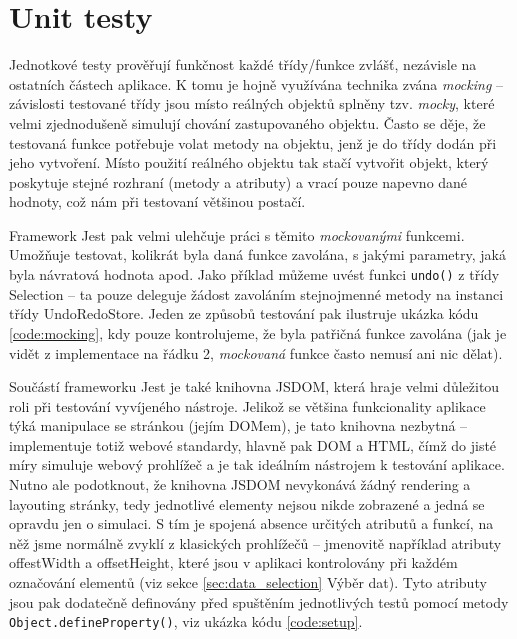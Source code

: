 \documentclass[thesis=B,czech]{FITthesis}[2012/06/26]
\begin{document}

\section{Unit testy}
Jednotkové testy prověřují funkčnost každé třídy/funkce zvlášť, nezávisle na ostatních částech aplikace. K tomu je hojně využívána technika zvána \emph{mocking} -- závislosti testované třídy jsou místo reálných objektů splněny tzv. \emph{mocky}, které velmi zjednodušeně simulují chování zastupovaného objektu. Často se děje, že testovaná funkce potřebuje volat metody na objektu, jenž je do třídy dodán při jeho vytvoření. Místo použití reálného objektu tak stačí vytvořit objekt, který poskytuje stejné rozhraní (metody a atributy) a vrací pouze napevno dané hodnoty, což nám při testovaní většinou postačí.

Framework Jest pak velmi ulehčuje práci s těmito \emph{mockovanými} funkcemi. Umožňuje testovat, kolikrát byla daná funkce zavolána, s jakými parametry, jaká byla návratová hodnota apod. Jako příklad můžeme uvést funkci \verb|undo()| z třídy Selection -- ta pouze deleguje žádost zavoláním stejnojmenné metody na instanci třídy UndoRedoStore. Jeden ze způsobů testování pak ilustruje ukázka kódu \ref{code:mocking}, kdy pouze kontrolujeme, že byla patřičná funkce zavolána (jak je vidět z implementace na řádku 2, \emph{mockovaná} funkce často nemusí ani nic dělat).

Součástí frameworku Jest je také knihovna JSDOM, která hraje velmi důležitou roli při testování vyvíjeného nástroje. Jelikož se většina funkcionality aplikace týká manipulace se stránkou (jejím DOMem), je tato knihovna nezbytná -- implementuje totiž webové standardy, hlavně pak DOM a HTML, čímž do jisté míry simuluje webový prohlížeč a je tak ideálním nástrojem k testování aplikace. Nutno ale podotknout, že knihovna JSDOM nevykonává žádný rendering a layouting stránky, tedy jednotlivé elementy nejsou nikde zobrazené a jedná se opravdu jen o simulaci. S tím je spojená absence určitých atributů a funkcí, na něž jsme normálně zvyklí z klasických prohlížečů -- jmenovitě například atributy \textsf{offestWidth} a \textsf{offsetHeight}, které jsou v aplikaci kontrolovány při každém označování elementů (viz sekce \ref{sec:data_selection} Výběr dat). Tyto atributy jsou pak dodatečně definovány před spuštěním jednotlivých testů pomocí metody \verb|Object.defineProperty()|, viz ukázka kódu \ref{code:setup}.
\end{document}
